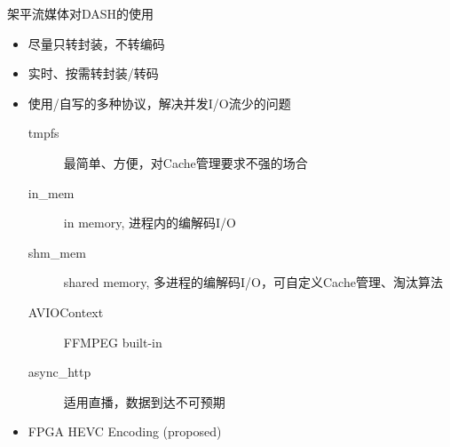 \documentclass{beamer}
\begin{document}
\begin{frame}{架平流媒体对DASH的使用}
\begin{itemize}
\item 尽量只转封装，不转编码
\item 实时、按需转封装/转码
\item 使用/自写的多种协议，解决并发I/O流少的问题
	\begin{description}
	\item[tmpfs] 最简单、方便，对Cache管理要求不强的场合
	\item[in\_mem] in memory, 进程内的编解码I/O
	\item[shm\_mem] shared memory, 多进程的编解码I/O，可自定义Cache管理、淘汰算法
	\item[AVIOContext] FFMPEG built-in
	\item[async\_http] 适用直播，数据到达不可预期
\end{description}
\item FPGA HEVC Encoding (proposed)
\end{itemize}
\end{frame}
\end{document}
